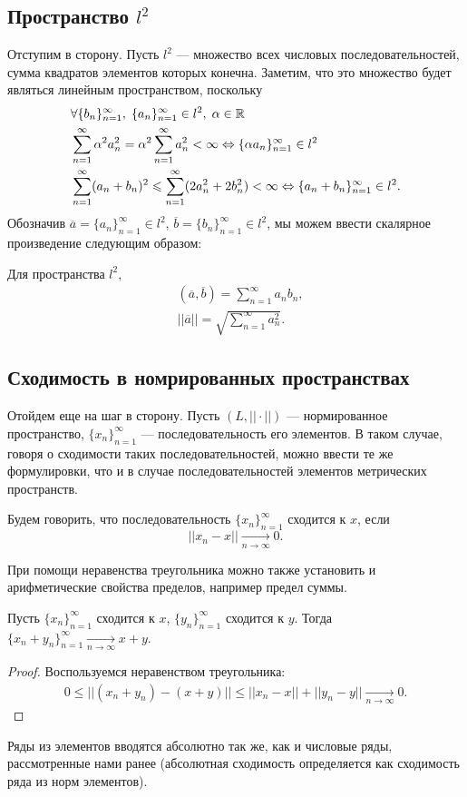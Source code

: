 \subsection{Пространство $l^2$}
Отступим в сторону.
Пусть $l^2$ --- множество всех числовых последовательностей, сумма квадратов элементов которых конечна. Заметим, что это множество будет являться линейным пространством, поскольку
\begin{align*}
    &\forall \{b_n\}_{n=1}^{\infty},\; \{a_n\}_{n=1}^{\infty} \in l^2,\; \alpha \in \mathbb{R}\\
    &\sum\limits_{n=1}^{\infty} \alpha^2 a_n^2 = \alpha^2 \sum\limits_{n=1}^{\infty} a_n^2 < \infty \Leftrightarrow \{\alpha a_n\}_{n=1}^{\infty} \in l^2\\
    &\sum\limits_{n=1}^{\infty} (a_n+b_n)^2 \leqslant \sum\limits_{n=1}^{\infty} (2a_n^2 + 2b_n^2) < \infty \Leftrightarrow \{a_n + b_n\}_{n=1}^{\infty} \in l^2.
\end{align*}
Обозначив $\overline{a} = \{a_n\}_{n=1}^{\infty}\in l^2$, $\overline{b} = \{b_n\}_{n=1}^{\infty} \in l^2$, мы можем ввести скалярное произведение следующим образом:
\begin{Def}
    Для пространства $l^2$, 
    \begin{align*}
        &(\overline{a}, \overline{b}) = \sum\limits_{n=1}^{\infty} a_nb_n,\\
        &||\overline{a}|| = \sqrt{\sum\limits_{n=1}^{\infty}a_n^2}.
    \end{align*}
\end{Def}
\subsection{Сходимость в номрированных пространствах}
Отойдем еще на шаг в сторону. Пусть $(L, ||\cdot||)$ --- нормированное пространство, $\{x_n\}_{n=1}^{\infty}$ --- последовательность его элементов. В таком случае, говоря о сходимости таких последовательностей, можно ввести те же формулировки, что и в случае последовательностей элементов метрических пространств.
\begin{Def}
    Будем говорить, что последовательность $\{x_n\}_{n=1}^{\infty}$ сходится к $x$, если 
    $$
        ||x_n - x|| \underset{n\to \infty}{\to} 0.
    $$
\end{Def}
При помощи неравенства треугольника можно также установить и арифметические свойства пределов, например предел суммы.
\begin{Statement}
    Пусть $\{x_n\}_{n=1}^{\infty}$ сходится к $x$, $\{y_n\}_{n=1}^{\infty}$ сходится к $y$. Тогда  $\{x_n + y_n\}_{n=1}^{\infty} \underset{n\to \infty}{\to} x+y$.
\end{Statement}
\begin{proof}
    Воспользуемся неравенством треугольника:
    \begin{gather*}
        0\leqslant ||(x_n + y_n) - (x + y)|| \leqslant ||x_n-x|| + ||y_n - y|| \underset{n\to\infty}{\to} 0.
    \end{gather*}
\end{proof}
Ряды из элементов вводятся абсолютно так же, как и числовые ряды, рассмотренные нами ранее (абсолютная сходимость определяется как сходимость ряда из норм элементов).

